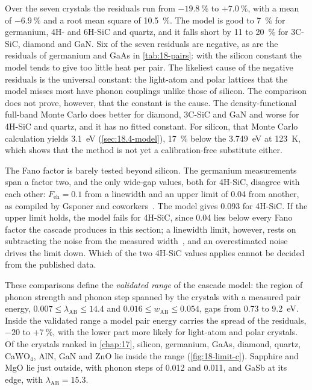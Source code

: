 Over the seven crystals the residuals run from $-\SI{19.8}{\percent}$ to $+\SI{7.0}{\percent}$, with a mean of $-\SI{6.9}{\percent}$ and a root mean square of \SI{10.5}{\percent}. The model is good to \SI{7}{\percent} for germanium, 4H- and 6H-SiC and quartz, and it falls short by 11 to \SI{20}{\percent} for 3C-SiC, diamond and GaN. Six of the seven residuals are negative, as are the residuals of germanium and GaAs in \cref{tab:18-pairs}: with the silicon constant the model tends to give too little heat per pair. The likeliest cause of the negative residuals is the universal constant: the light-atom and polar lattices that the model misses most have phonon couplings unlike those of silicon. The comparison does not prove, however, that the constant is the cause. The density-functional full-band Monte Carlo does better for diamond, 3C-SiC and GaN and worse for 4H-SiC and quartz, and it has no fitted constant. For silicon, that Monte Carlo calculation yields \SI{3.1}{eV} (\cref{sec:18.4-model}), \SI{17}{\percent} below the \SI{3.749}{eV} at \SI{123}{K}, which shows that the method is not yet a calibration-free substitute either.

The Fano factor is barely tested beyond silicon. The germanium measurements span a factor two, and the only wide-gap values, both for 4H-SiC, disagree with each other: $F_{\mathrm{eh}} = 0.1$ from a linewidth and an upper limit of 0.04 from another, as compiled by Gsponer and coworkers~\cite[Table~2]{gsponer2023measurement}. The model gives 0.093 for 4H-SiC. If the upper limit holds, the model fails for 4H-SiC, since 0.04 lies below every Fano factor the cascade produces in this section; a linewidth limit, however, rests on subtracting the noise from the measured width~\cite[Eq.~(3)]{gsponer2023measurement}, and an overestimated noise drives the limit down. Which of the two 4H-SiC values applies cannot be decided from the published data.

These comparisons define the \emph{validated range} of the cascade model: the region of phonon strength and phonon step spanned by the crystals with a measured pair energy, $0.007 \le \lambda_{\mathrm{AB}} \le 14.4$ and $0.016 \le w_{\mathrm{AB}} \le 0.054$, gaps from 0.73 to \SI{9.2}{eV}. Inside the validated range a model pair energy carries the spread of the residuals, $-20$ to $+\SI{7}{\percent}$, with the lower part more likely for light-atom and polar crystals. Of the crystals ranked in \cref{chap:17}, silicon, germanium, GaAs, diamond, quartz, CaWO$_4$, AlN, GaN and ZnO lie inside the range (\cref{fig:18-limit-c}). Sapphire and MgO lie just outside, with phonon steps of 0.012 and 0.011, and GaSb at its edge, with $\lambda_{\mathrm{AB}} = 15.3$.

